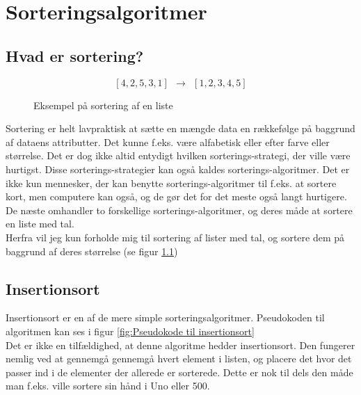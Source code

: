 \chapter{Sorteringsalgoritmer}
\label{ch:Sorteringsalgoritmer}

\section{Hvad er sortering?}
\label{sec:Hvad er sortering?}

\begin{figure}
	\begin{center}
		$$[4,2,5,3,1] \:\:\longrightarrow\:\: [1,2,3,4,5]$$
	\end{center}
	\caption{Eksempel på sortering af en liste}
	\label{fig:Eksempel på sortering af en liste}
\end{figure}


Sortering er helt lavpraktisk at sætte en mængde data en rækkefølge på baggrund af dataens attributter. Det kunne f.eks. være alfabetisk eller efter farve eller størrelse. Det er dog ikke altid entydigt hvilken sorterings-strategi, der ville være hurtigst. Disse sorterings-strategier kan også kaldes sorterings-algoritmer. Det er ikke kun mennesker, der kan benytte sorterings-algoritmer til f.eks. at sortere kort, men computere kan også, og de gør det for det meste også langt hurtigere. De næste  omhandler to forskellige sorterings-algoritmer, og deres måde at sortere en liste med tal.\\


Herfra vil jeg kun forholde mig til sortering af lister med tal, og sortere dem på baggrund af deres størrelse (se figur \ref{fig:Eksempel på sortering af en liste})


\section{Insertionsort}
\label{sec:Insertionsort}

Insertionsort er en af de mere simple sorteringsalgoritmer. Pseudokoden til algoritmen kan ses i figur \ref{fig:Pseudokode til insertionsort}\\

Det er ikke en tilfældighed, at denne algoritme hedder insertionsort. Den fungerer nemlig ved at gennemgå gennemgå hvert element i listen, og placere det hvor det passer ind i de elementer der allerede er sorterede. Dette er nok til dels den måde man f.eks. ville sortere sin hånd i Uno eller 500. 

